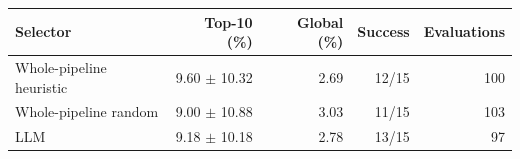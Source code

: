\begin{tabular}{lrrrr}
\toprule
Selector & Top-10 (\%) & Global (\%) & Success & Evaluations \\
\midrule
Whole-pipeline heuristic & 9.60 $\pm$ 10.32 & 2.69 & 12/15 & 100 \\
Whole-pipeline random & 9.00 $\pm$ 10.88 & 3.03 & 11/15 & 103 \\
LLM & 9.18 $\pm$ 10.18 & 2.78 & 13/15 & 97 \\
\bottomrule
\end{tabular}